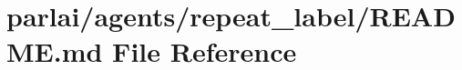 \hypertarget{parlai_2agents_2repeat__label_2README_8md}{}\section{parlai/agents/repeat\+\_\+label/\+R\+E\+A\+D\+ME.md File Reference}
\label{parlai_2agents_2repeat__label_2README_8md}
